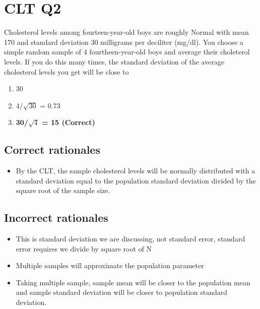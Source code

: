 \documentclass[letterpaper,12pt,twoside,printwatermark=false]{pinp}
\providecommand{\tightlist}{%
  \setlength{\itemsep}{0pt}\setlength{\parskip}{0pt}}
\begin{document}
\hypertarget{clt-q2}{%
\section{CLT Q2}\label{clt-q2}}

Cholesterol levels among fourteen-year-old boys are roughly Normal with
mean 170 and standard deviation 30 milligrams per deciliter (mg/dl). You
choose a simple random sample of 4 fourtheen-year-old boys and average
their choleterol levels. If you do this many times, the standard
deviation of the average cholesterol levels you get will be close to

\begin{enumerate}
\def\labelenumi{\alph{enumi})}
\tightlist
\item
  30
\item
  4/\(\sqrt{30}\) = 0.73
\item
  \textbf{30/\(\sqrt{4}\) = 15 (Correct)}
\end{enumerate}

\hypertarget{correct-rationales-3}{%
\subsection{Correct rationales}\label{correct-rationales-3}}

\begin{itemize}
\tightlist
\item
  By the CLT, the sample cholesterol levels will be normally distributed
  with a standard deviation equal to the population standard deviation
  divided by the square root of the sample size.
\end{itemize}

\hypertarget{incorrect-rationales-3}{%
\subsection{Incorrect rationales}\label{incorrect-rationales-3}}

\begin{itemize}
\tightlist
\item
  This is standard deviation we are discussing, not standard error,
  standard error requires we divide by square root of N
\item
  Multiple samples will approximate the population parameter
\item
  Taking multiple sample, sample mean will be closer to the population
  mean and sample standard deviation will be closer to population
  standard deviation.
\end{itemize}
\end{document}
